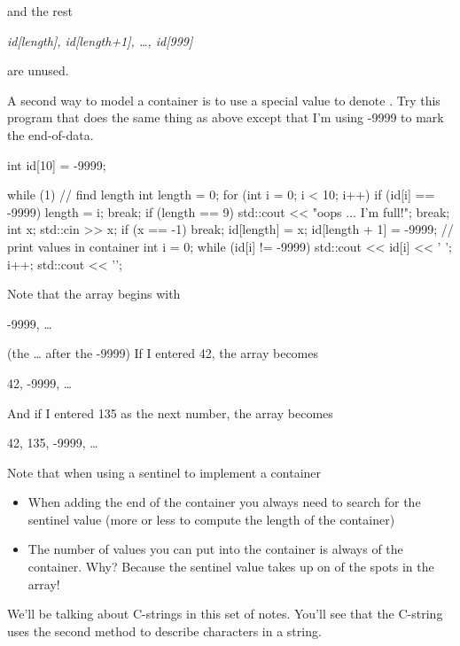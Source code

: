 and the rest

\begin{center}
\textit{id[length], id[length+1], \ldots, id[999]}
\end{center}

are unused.

A second way to model a container is to use a special  value to denote . Try this program that does the same thing as above except that I'm using -9999 to mark the end-of-data.

\begin{consolethree}[escapeinside=||]
int id[10] = {-9999};

while (1)
{
    // find length
    int length = 0;
    for (int i = 0; i < 10; i++)
    {
        if (id[i] == -9999)
        {
            length = i;
            break;
        }
    }
    if (length == 9)
    {
        std::cout << "oops ... I'm full!\n";
        break;
    }
    int x;
    std::cin >> x;
    if (x == -1) break;
    id[length] = x;
    id[length + 1] = -9999;
    // print values in container
    int i = 0;
    while (id[i] != -9999)
    {
        std::cout << id[i] << ' ';
        i++;
    }
    std::cout << '\n';
}
\end{consolethree}

Note that the array begins with

\begin{center}
-9999, \ldots{}
\end{center}

(the \ldots{} after the -9999) If I entered 42, the array becomes

\begin{center}
42, -9999, \ldots{}
\end{center}

And if I entered 135 as the next number, the array becomes

\begin{center}
42, 135, -9999, \ldots{}
\end{center}

Note that when using a sentinel to implement a container

\begin{itemize}
\item
When adding the end of the container you always need to search for the sentinel value (more or less to compute the length of the container)
\item
The number of values you can put into the container is always  of the container. Why? Because the sentinel value takes up on of the spots in the array!
\end{itemize}

We'll be talking about C-strings in this set of notes. You'll see that the C-string uses the second method to describe characters in a string.


